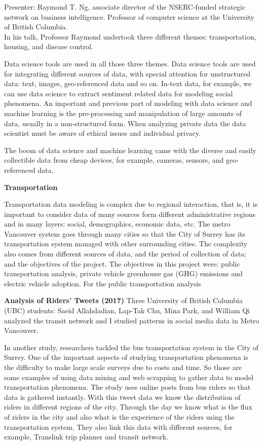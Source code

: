 \documentclass[9pt,a4paper]{article}
\begin{document}
Presenter: Raymond T. Ng, associate director of the NSERC-funded strategic network on business intelligence. Professor of computer science at the University of British Columbia.\\

In his talk, Professor Raymond undertook three different themes: transportation, housing, and disease control. 

Data science tools are used in all those three themes. 
Data science tools are used for integrating different sources of data, with special attention for unstructured data: text, images, geo-referenced data and so on. 
In-text data, for example, we can use data science to extract sentiment related data for modeling social phenomena. 
An important and previous part of modeling with data science and machine learning is the pre-processing and manipulation of large amounts of data, usually in a non-structured form.  When analyzing private data the data scientist must be aware of ethical issues and individual privacy. 

The boom of data science and machine learning came with the diverse and easily collectible data from cheap devices, for example, cameras, sensors, and geo-referenced data. 

\textbf{Transportation}

Transportation data modeling is complex due to regional interaction, that is, it is important to consider data of many sources form different administrative regions and in many layers: social, demographics, economic data, etc. 
The metro Vancouver system goes through many cities so that the City of Surrey has its transportation system managed with other surrounding cities. 
The complexity also comes from different sources of data, and the period of collection of data; and the objectives of the project. The objectives in this project were: public transportation analysis, private vehicle greenhouse gas (GHG) emissions and electric vehicle adoption.
For the public transportation analysis 

\textbf{Analysis of Riders’ Tweets (2017)}
Three University of British Columbia (UBC) students: Saeid Allahdadian, Lap-Tak Chu, Mina Park, and William Qi analyzed the transit network and I studied patterns in social media data in Metro Vancouver.

In another study, researchers tackled the bus transportation system in the City of Surrey. One of the important aspects of studying transportation phenomena is the difficulty to make large scale surveys due to costs and time. So those are some examples of using data mining and web scrapping to gather data to model transportation phenomena. The study uses online posts from bus riders so that data is gathered instantly. With this tweet data we know the distribution of riders in different regions of the city. Through the day we know what is the flux of riders in the city and also what is the experience of the riders using the transportation system. They also link this data with different sources, for example, Translink trip planner and transit network. 
\end{document}
